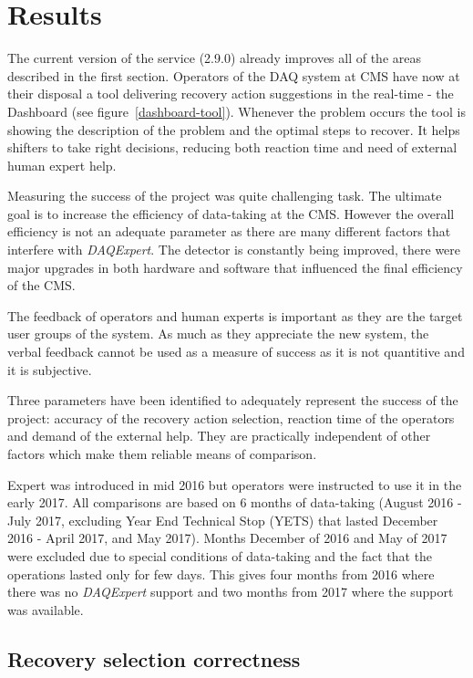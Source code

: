\documentclass[a4paper]{jpconf}
\begin{document}
\section{Results}

The current version of the service (2.9.0) already improves all of the areas described in the first section. Operators of the DAQ system at CMS have now at their disposal a tool delivering recovery action suggestions in the real-time - the Dashboard (see figure~\ref{dashboard-tool}). Whenever the problem occurs the tool is showing the description of the problem and the optimal steps to recover. It helps shifters to take right decisions, reducing both reaction time and need of external human expert help.

Measuring the success of the project was quite challenging task. The ultimate goal is to increase the efficiency of data-taking at the CMS. However the overall efficiency is not an adequate parameter as there are many different factors that interfere with{ \it DAQExpert}. The detector is constantly being improved, there were major upgrades in both hardware and software that influenced the final efficiency of the CMS.

The feedback of operators and human experts is important as they are the target user groups of the system. As much as they appreciate the new system, the verbal feedback cannot be used as a measure of success as it is not quantitive and it is subjective.

Three parameters have been identified to adequately represent the success of the project: accuracy of the recovery action selection, reaction time of the operators and demand of the external help. They are practically independent of other factors which make them reliable means of comparison.

Expert was introduced in mid 2016 but operators were instructed to use it in the early 2017. All comparisons are based on 6 months of data-taking (August 2016 - July 2017, excluding Year End Technical Stop (YETS) that lasted December 2016 - April 2017, and May 2017). Months December of 2016 and May of 2017 were excluded due to special conditions of data-taking and the fact that the operations lasted only for few days. This gives four months from 2016 where there was no{ \it DAQExpert} support and two months from 2017 where the support was available. 


\subsection{Recovery selection correctness}
\end{document}

